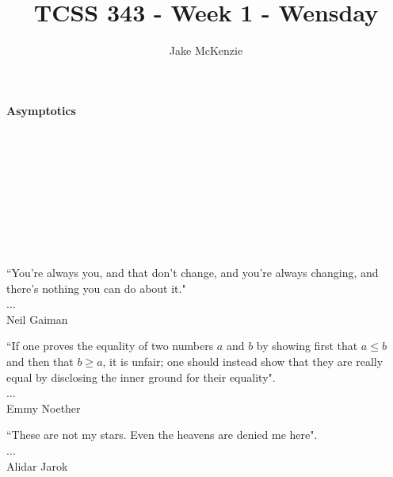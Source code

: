 \documentclass[12pt]{article}
\begin{document}
\title{TCSS 343 - Week 1 - Wensday}
\author{Jake McKenzie}
\maketitle
\noindent\centerline{\textbf{Asymptotics}}\\\\\\\\\\\\\\\\
\begin{center}
    ``You're always you, and that don't change, and you're always changing, and there's nothing you can do about it." \\$\dots$\\ Neil Gaiman
\end{center}
\begin{center}
    ``If one proves the equality of two numbers $a$ and $b$ by showing first that $a \leq b$ and then that $b \geq a$, it is unfair; one should instead show that they are really equal by disclosing the inner ground for their equality". \\$\dots$\\Emmy Noether
\end{center}
\begin{center}
    ``These are not my stars. Even the heavens are denied me here". \\$\dots$\\Alidar Jarok
\end{center}
\newpage
\end{document}
